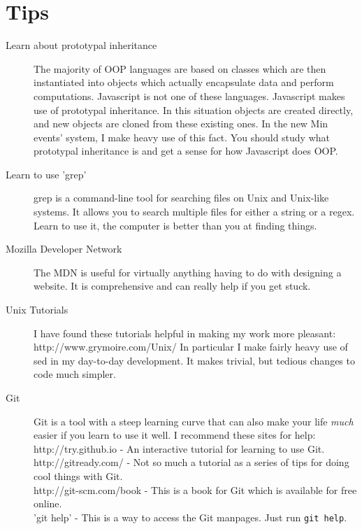 \documentclass[letterpaper]{article}
\begin{document}
\section*{Tips}
\begin{description}
    \item[Learn about prototypal inheritance] The majority of OOP languages are
        based on classes which are then instantiated into objects which actually
        encapsulate data and perform computations. Javascript is not one of
        these languages. Javascript makes use of prototypal inheritance. In this
        situation objects are created directly, and new objects are cloned from
        these existing ones. In the new Min events' system, I make heavy use of
        this fact. You should study what prototypal inheritance is and get a
        sense for how Javascript does OOP.
    \item[Learn to use 'grep'] grep is a command-line tool for searching files
        on Unix and Unix-like systems. It allows you to search multiple files
        for either a string or a regex. Learn to use it, the computer is better
        than you at finding things.
    \item[Mozilla Developer Network] The MDN is useful for virtually anything
        having to do with designing a website. It is comprehensive and can
        really help if you get stuck.
    \item[Unix Tutorials] I have found these tutorials helpful in making my work
        more pleasant: http://www.grymoire.com/Unix/ 
        In particular I make fairly heavy use of sed in my day-to-day
        development. It makes trivial, but tedious changes to code much
        simpler.
    \item[Git] Git is a tool with a steep learning curve that can also make your
        life \emph{much} easier if you learn to use it well. I recommend these
        sites for help:\\ 
        http://try.github.io - An interactive tutorial for learning to use
        Git.\\
        http://gitready.com/ - Not so much a tutorial as a series of tips for
        doing cool things with Git.\\
        http://git-scm.com/book - This is a book for Git which is available for
        free online. \\
        'git help' - This is a way to access the Git manpages. 
        Just run \verb+git help+.
\end{description}
\end{document}
